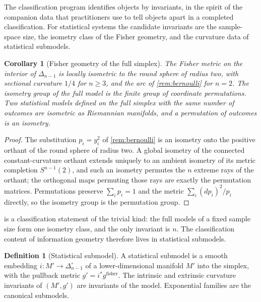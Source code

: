 \documentclass[11pt,letterpaper]{article}
\newtheorem{corollary}[theorem]{Corollary}
\theoremstyle{definition}
\newtheorem{definition}[theorem]{Definition}
\theoremstyle{remark}
\begin{document}
The classification program identifies objects by invariants, in the spirit of the companion data that practitioners use to tell objects apart in a completed classification. For statistical systems the candidate invariants are the sample-space size, the isometry class of the Fisher geometry, and the curvature data of statistical submodels.

\begin{corollary}[Fisher geometry of the full simplex]
\label{cor:homogeneity}
The Fisher metric on the interior of $\Delta_{n-1}$ is locally isometric to the round sphere of radius two, with sectional curvature $1/4$ for $n \geq 3$, and the arc of \cref{rem:bernoulli} for $n = 2$. The isometry group of the full model is the finite group of coordinate permutations. Two statistical models defined on the full simplex with the same number of outcomes are isometric as Riemannian manifolds, and a permutation of outcomes is an isometry.
\end{corollary}

\begin{proof}
The substitution $p_i = y_i^2$ of \cref{rem:bernoulli} is an isometry onto the positive orthant of the round sphere of radius two. A global isometry of the connected constant-curvature orthant extends uniquely to an ambient isometry of its metric completion $S^{n-1}(2)$, and such an isometry permutes the $n$ extreme rays of the orthant; the orthogonal maps permuting those rays are exactly the permutation matrices. Permutations preserve $\sum_i p_i = 1$ and the metric $\sum_i (dp_i)^2 / p_i$ directly, so the isometry group is the permutation group.
\end{proof}

 is a classification statement of the trivial kind: the full models of a fixed sample size form one isometry class, and the only invariant is $n$. The classification content of information geometry therefore lives in statistical submodels.

\begin{definition}[Statistical submodel]
\label{def:submodel}
A statistical submodel is a smooth embedding $i : M' \to \Delta_{n-1}^{\circ}$ of a lower-dimensional manifold $M'$ into the simplex, with the pullback metric $g' = i^{*} g^{\mathrm{fisher}}$. The intrinsic and extrinsic curvature invariants of $(M', g')$ are invariants of the model. Exponential families are the canonical submodels.
\end{definition}
\end{document}
